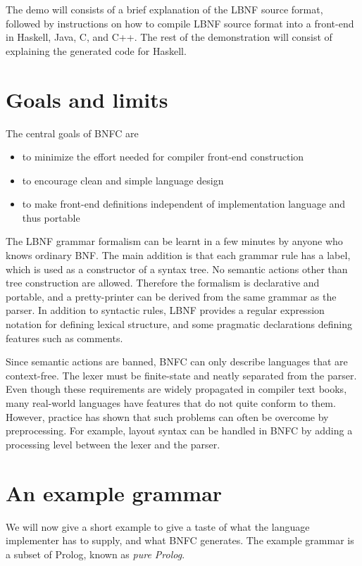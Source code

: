 \documentclass{sig-alt}
\begin{document}
The demo will consists of a brief explanation of the LBNF source format, 
followed by instructions on how to compile LBNF source format into a 
front-end in Haskell, Java, C, and C++. The rest of the demonstration will 
consist of explaining the generated code for Haskell.


\section{Goals and limits}

The central goals of BNFC are
\begin{itemize}
\item to minimize the effort needed for compiler front-end construction
\item to encourage clean and simple language design
\item to make front-end definitions independent of implementation
  language and thus portable
\end{itemize}

The LBNF grammar formalism can be learnt in a few minutes by anyone who knows
ordinary BNF. The main addition is that each grammar rule has a label, which
is used as a constructor of a syntax tree. No semantic actions other
than tree construction are allowed. Therefore the formalism
is declarative and portable, and a pretty-printer can be
derived from the same grammar as the parser. In addition to syntactic
rules, LBNF provides a regular expression notation for defining
lexical structure, and some pragmatic declarations defining features
such as comments.

Since semantic actions are banned, BNFC can only describe
languages that are context-free. The lexer must be
finite-state and neatly separated from the parser. Even though these 
requirements are widely propagated in compiler text books,
many real-world languages have features that do not quite conform to them.
However, practice has shown that such problems can often be overcome
by preprocessing. For example, layout syntax can be handled in
BNFC by adding a processing level between the lexer and the parser. 


\section{An example grammar}

We will now give a short example to give a taste of what 
the language implementer has to supply, 
and what BNFC generates.
The example grammar is a subset of Prolog, known as 
\textit{pure Prolog}.
\end{document}
